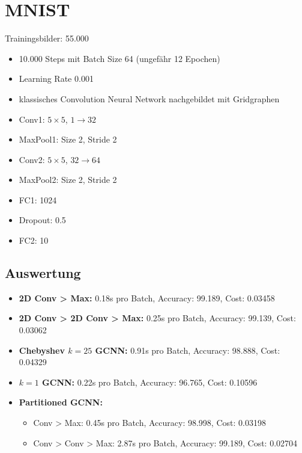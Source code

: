 \section{MNIST}

Trainingsbilder: 55.000

\begin{itemize}
  \item 10.000 Steps mit Batch Size 64 (ungefähr 12 Epochen)
  \item Learning Rate 0.001
  \item klassisches Convolution Neural Network nachgebildet mit Gridgraphen
  \item Conv1: $5 \times 5$, $1 \rightarrow 32$
  \item MaxPool1: Size 2, Stride 2
  \item Conv2: $5 \times 5$, $32 \rightarrow 64$
  \item MaxPool2: Size 2, Stride 2
  \item FC1: 1024
  \item Dropout: 0.5
  \item FC2: 10
\end{itemize}

\subsection{Auswertung}

\begin{itemize}
  \item \textbf{2D Conv > Max:} 0.18s pro Batch, Accuracy: 99.189, Cost: 0.03458
  \item \textbf{2D Conv > 2D Conv > Max:} 0.25s pro Batch, Accuracy: 99.139, Cost: 0.03062
  \item \textbf{Chebyshev $k=25$ GCNN:} 0.91s pro Batch, Accuracy: 98.888, Cost: 0.04329
  \item \textbf{$k=1$ GCNN:} 0.22s pro Batch, Accuracy: 96.765, Cost: 0.10596
  \item \textbf{Partitioned GCNN:}
  \begin{itemize}
    \item Conv > Max: 0.45s pro Batch, Accuracy: 98.998, Cost: 0.03198
    \item Conv > Conv > Max: 2.87s pro Batch, Accuracy: 99.189, Cost: 0.02704
  \end{itemize}
\end{itemize}
